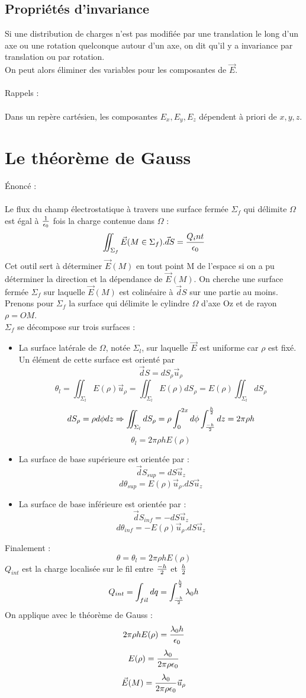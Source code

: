 \documentclass[11pt,a4paper,french]{article}
\begin{document}
\subsection{Propriétés d'invariance}
Si une distribution de charges n'est pas modifiée par une translation le long d'un axe ou une rotation quelconque autour d'un axe, on dit qu'il y a invariance par translation ou par rotation. \\
On peut alors éliminer des variables pour les composantes de $\vec E$. \\ \\
Rappels : \\ \\
Dans un repère cartésien, les composantes $E_x, E_y, E_z$ dépendent à priori de $x, y, z$.
\newpage
\section{Le théorème de Gauss}
Énoncé : \\ \\
Le flux du champ électrostatique à travers une surface fermée $\Sigma_f$ qui délimite $\Omega$ est égal à $1 \over \epsilon_0$ fois la charge contenue dans $\Omega$ : 
$$\iint_{\Sigma_f} \vec E(M \in \Sigma_f) .\vec dS = {Q_int \over \epsilon_0}$$
Cet outil sert à déterminer $\vec E(M)$ en tout point M de l'espace si on a pu déterminer la direction et la dépendance de $\vec E(M)$. On cherche une surface fermée $\Sigma_f$ sur laquelle $\vec E(M)$ est colinéaire à $\vec dS$ sur une partie au moins. \\
Prenons pour $\Sigma_f$ la surface qui délimite le cylindre $\Omega$ d'axe Oz et de rayon $\rho = OM$. \\
$\Sigma_f$ se décompose sur trois surfaces : 
\begin{itemize}
\item La surface latérale de $\Omega$, notée $\Sigma_l$, sur laquelle $\vec E$ est uniforme car $\rho$ est fixé. \\
Un élément de cette surface est orienté par 
$$\vec dS = dS_\rho \vec u_\rho$$
$$\theta_{l} = \iint_{\Sigma_l} E(\rho) \vec u_\rho=\iint_{\Sigma_l} E(\rho)dS_\rho=E(\rho)\iint_{\Sigma_l} dS_\rho$$
$$dS_\rho = \rho d\phi dz \Rightarrow\iint_{\Sigma_l}dS_\rho=\rho\int_0^{2x}d\phi\int_{-h \over 2}^{h\over 2}dz = 2\pi\rho h $$
$$\theta_l=2\pi\rho h E(\rho)$$
\item La surface de base supérieure est orientée par : 
$$\vec dS_{sup} = dS\vec u_z$$
$$d\theta_{sup} = E(\rho) \vec u_\rho . dS \vec u_z$$
\item La surface de base inférieure est orientée par : 
$$\vec dS_{inf} = -dS\vec u_z$$
$$d\theta_{inf} = -E(\rho) \vec u_\rho . dS \vec u_z$$
\end{itemize}
\newpage
Finalement : 
$$\theta = \theta_l = 2 \pi \rho h E(\rho)$$
$Q_{int}$ est la charge localisée sur le fil entre $-h \over 2$ et $h \over 2$
$$Q_{int} = \int_{fil} dq = \int_{-h \over 2}^{h \over 2} \lambda_0 h$$
On applique avec le théorème de Gauss : 
$$2 \pi \rho h E(\rho) = {\lambda_0 h \over \epsilon_0}$$
$$E(\rho) = {\lambda_0 \over 2\pi\rho\epsilon_0}$$
$$\vec E(M) = {\lambda_0 \over 2\pi\rho\epsilon_0} \vec u_\rho$$
\end{document}

